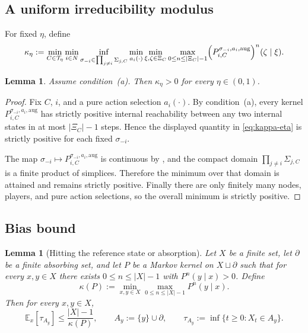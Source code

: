 \documentclass[12pt]{article}
\newtheorem{lemma}[theorem]{Lemma}
\theoremstyle{definition}
\newcommand{\E}{\mathbb{E}}
\newcommand{\1}{\mathbf{1}}
\newcommand{\cT}{\mathcal{T}}
\begin{document}
\subsection{A uniform irreducibility modulus}

For fixed $\eta$, define
\begin{equation}
\label{eq:kappa-eta}
\kappa_\eta
:=
\min_{C\in\cT_\eta}
\min_{i\in N}
\inf_{\sigma_{-i}\in\prod_{j\ne i}\Sigma_{j,C}}
\min_{a_i(\cdot)}
\min_{\xi,\zeta\in\Xi_C}
\max_{0\le n\le |\Xi_C|-1}
\Bigl(P_{i,C}^{\sigma_{-i},a_i,\mathrm{aug}}\Bigr)^n(\zeta\mid\xi).
\end{equation}

\begin{lemma}
\label{lem:kappa-positive}
Assume condition~\textnormal{(a)}. Then $\kappa_\eta>0$ for every $\eta\in(0,1)$.
\end{lemma}

\begin{proof}
Fix $C$, $i$, and a pure action selection $a_i(\cdot)$. By
condition~\textnormal{(a)}, every kernel
$P_{i,C}^{\sigma_{-i},a_i,\mathrm{aug}}$ has strictly positive internal
reachability between any two internal states in at most $|\Xi_C|-1$ steps. Hence
the displayed quantity in \eqref{eq:kappa-eta} is strictly positive for each fixed
$\sigma_{-i}$.

The map
$\sigma_{-i}\mapsto P_{i,C}^{\sigma_{-i},a_i,\mathrm{aug}}$ is continuous by
, and the compact domain
$\prod_{j\ne i}\Sigma_{j,C}$ is a finite product of simplices. Therefore the
minimum over that domain is attained and remains strictly positive. Finally there
are only finitely many nodes, players, and pure action selections, so the overall
minimum is strictly positive.
\end{proof}

\subsection{Bias bound}


\begin{lemma}[Hitting the reference state or absorption]
\label{lem:hitting-time}
Let $X$ be a finite set, let $\partial$ be a finite absorbing set, and let $P$ be a
Markov kernel on $X\sqcup\partial$ such that for every $x,y\in X$ there exists
$0\le n\le |X|-1$ with $P^n(y\mid x)>0$. Define
\[
\kappa(P):=\min_{x,y\in X}\max_{0\le n\le |X|-1}P^n(y\mid x).
\]
Then for every $x,y\in X$,
\[
\E_x[\tau_{A_y}]\le \frac{|X|-1}{\kappa(P)},
\qquad
A_y:=\{y\}\cup \partial,
\qquad
\tau_{A_y}:=\inf\{t\ge 0:X_t\in A_y\}.
\]
\end{lemma}
\end{document}
